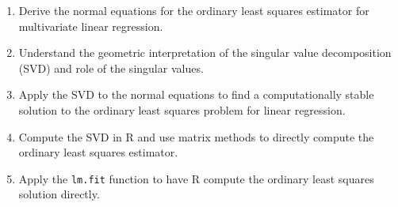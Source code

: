 \documentclass[11pt]{article}
\begin{document}
\begin{enumerate}
\item Derive the normal equations for the ordinary least squares estimator for
multivariate linear regression.

\item Understand the geometric interpretation of the singular value
decomposition (SVD) and role of the singular values.

\item Apply the SVD to the normal equations to find a computationally stable
solution to the ordinary least squares problem for linear regression.

\item Compute the SVD in R and use matrix methods to directly compute the
ordinary least squares estimator.

\item Apply the \verb|lm.fit| function to have R compute the ordinary least
squares solution directly.

\end{enumerate}
\end{document}
